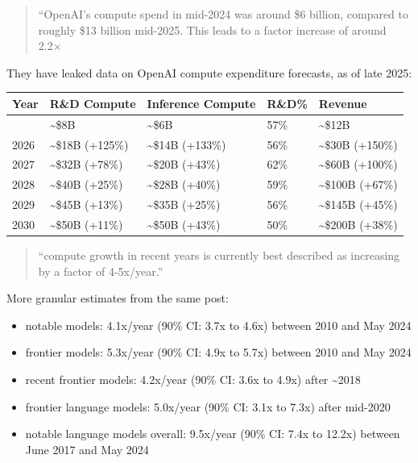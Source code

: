 \documentclass[
  11pt,
  letterpaper,
  DIV=11,
  numbers=noendperiod]{scrartcl}
\providecommand{\tightlist}{%
  \setlength{\itemsep}{0pt}\setlength{\parskip}{0pt}}
\begin{document}
\begin{description}
\begin{quote}
``OpenAI's compute spend in mid-2024 was around \$6 billion, compared to
roughly \$13 billion mid-2025. This leads to a factor increase of around
2.2×
\end{quote}
\item[Efrati and Muppidi (2025) ``OpenAI's \$350 Billion Computing Cost
Problem'']
They have leaked data on OpenAI compute expenditure forecasts, as of
late 2025:

\begin{longtable}[]{@{}lllll@{}}
\toprule\noalign{}
Year & R\&D Compute & Inference Compute & R\&D\% & Revenue \\
\midrule\noalign{}
\endhead
\bottomrule\noalign{}
\endlastfoot
2025 & \textasciitilde\$8B & \textasciitilde\$6B & 57\% &
\textasciitilde\$12B \\
2026 & \textasciitilde\$18B (+125\%) & \textasciitilde\$14B (+133\%) &
56\% & \textasciitilde\$30B (+150\%) \\
2027 & \textasciitilde\$32B (+78\%) & \textasciitilde\$20B (+43\%) &
62\% & \textasciitilde\$60B (+100\%) \\
2028 & \textasciitilde\$40B (+25\%) & \textasciitilde\$28B (+40\%) &
59\% & \textasciitilde\$100B (+67\%) \\
2029 & \textasciitilde\$45B (+13\%) & \textasciitilde\$35B (+25\%) &
56\% & \textasciitilde\$145B (+45\%) \\
2030 & \textasciitilde\$50B (+11\%) & \textasciitilde\$50B (+43\%) &
50\% & \textasciitilde\$200B (+38\%) \\
\end{longtable}
\item[Epoch AI (2025a) ``Training compute of frontier AI models grows by
4-5x per year'']
\begin{quote}
``compute growth in recent years is currently best described as
increasing by a factor of 4-5x/year.''
\end{quote}

More granular estimates from the same post:

\begin{itemize}
\tightlist
\item
  notable models: 4.1x/year (90\% CI: 3.7x to 4.6x) between 2010 and May
  2024
\item
  frontier models: 5.3x/year (90\% CI: 4.9x to 5.7x) between 2010 and
  May 2024
\item
  recent frontier models: 4.2x/year (90\% CI: 3.6x to 4.9x) after
  \textasciitilde2018
\item
  frontier language models: 5.0x/year (90\% CI: 3.1x to 7.3x) after
  mid-2020
\item
  notable language models overall: 9.5x/year (90\% CI: 7.4x to 12.2x)
  between June 2017 and May 2024
\end{itemize}


\end{description}
\end{document}
